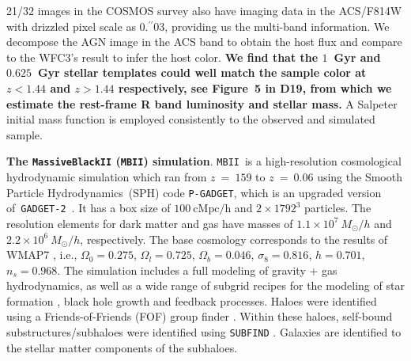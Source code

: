 \documentclass{natureprintstyle}
\newcommand{\hst}{{\it HST}}
\newcommand{\lhost}{$L_{\rm host}$}
\newcommand{\sersic}{S\'ersic}
\newcommand{\reff}{{$R_{\mathrm{eff}}$}}
\newcommand{\mstar}{{$M_*$}}
\newcommand{\farcs}{\mbox{\ensuremath{.\!\!^{\prime\prime}}}}%
\newcommand{\mbii}{\texttt{MBII}}
\begin{document}
21/32 images in the COSMOS survey also have imaging data in the ACS/F814W with drizzled pixel scale as 0\farcs03, providing us the multi-band information. We decompose the AGN image in the ACS band to obtain the host flux and compare to the WFC3's result to infer the host color. {\bf We find that the $1$~Gyr and $0.625$~Gyr stellar templates could well match the sample color at $z<1.44$ and $z>1.44$ respectively, see Figure~5 in D19, from which we estimate the rest-frame R band luminosity and stellar mass.} A Salpeter initial mass function is employed consistently to the observed and simulated sample.



\textbf{The \texttt{MassiveBlackII} (\mbii) simulation}.  
\mbii\ is a high-resolution cosmological hydrodynamic simulation which ran from $z~=~159$ to $z~=~0.06$ using the Smooth Particle Hydrodynamics~(SPH) code \texttt{P-GADGET}, which is an upgraded version of~\texttt{GADGET-2}~\cite{2005MNRAS.364.1105S}. It has a box size of $100~\mathrm{cMpc/h}$ and $2\times1792^3$ particles. The resolution elements for dark matter and gas have masses of $1.1\times 10^7~M_{\odot}/h$ and $2.2\times 10^6~M_{\odot}/h$, respectively. The base cosmology corresponds to the results of WMAP7 \cite{2011ApJS..192...18K}, i.e., $\Omega_0=0.275$, $\Omega_l=0.725$, $\Omega_b=0.046$, $\sigma_8=0.816$, $h = 0.701$, $n_s=0.968$.  The simulation includes a full modeling of gravity + gas hydrodynamics, as well as a wide range of subgrid recipes for the modeling of star formation \cite{2003MNRAS.339..289S}, black hole growth and feedback processes. Haloes were identified using a Friends-of-Friends (FOF) group finder \cite{1985ApJ...292..371D}. Within these haloes, self-bound substructures/subhaloes were identified using \texttt{SUBFIND} \cite{2005MNRAS.364.1105S}. Galaxies are identified to the stellar matter components of the subhaloes.
\end{document}

